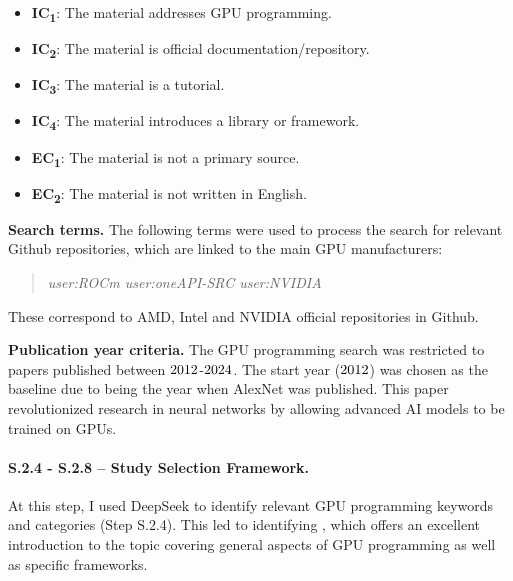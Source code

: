 \begin{itemize}
	\item \textbf{IC\textsubscript{1}}: The material addresses GPU programming.
	\item \textbf{IC\textsubscript{2}}: The material is official documentation/repository.
	\item \textbf{IC\textsubscript{3}}: The material is a tutorial.
	\item \textbf{IC\textsubscript{4}}: The material introduces a library or framework. \\
	\item \textbf{EC\textsubscript{1}}: The material is not a primary source.
	\item \textbf{EC\textsubscript{2}}: The material is not written in English.
\end{itemize}

\textbf{Search terms.}
The following terms were used to process the search for relevant Github repositories, which are
linked to the main GPU manufacturers:

\begin{quote}
	\textit{user:ROCm user:oneAPI-SRC user:NVIDIA}
\end{quote}

These correspond to AMD, Intel and NVIDIA official repositories in Github.

\textbf{Publication year criteria.}
The GPU programming search was restricted to papers published between
$2012$-$2024$. The start year ($2012$) was chosen as the baseline due
to being the year when AlexNet \cite{krizhevsky_imagenet_2012} was published. This paper
revolutionized research in neural networks by allowing advanced AI models to be trained on GPUs.

\paragraph{S.2.4 - S.2.8 -- Study Selection Framework.}
\label{sec:ai-screening}
At this step, I used DeepSeek \cite{noauthor_deepseek_nodate} to identify relevant GPU programming
keywords and categories (Step S.2.4). This led to identifying \cite{noauthor_enccsgpu-programming_nodate}, which
offers an excellent introduction to the topic covering general aspects of GPU programming as well
as specific frameworks.



